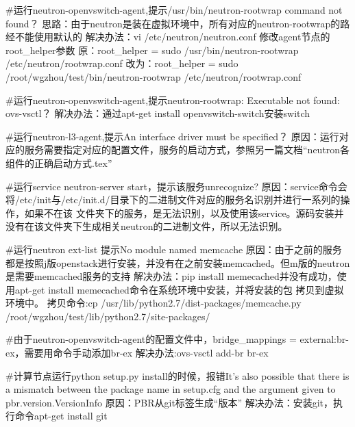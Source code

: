 \documentclass[a4paper,left=1.5cm,right=1.5cm,11pt]{article}
\begin{document}
\begin{itemize}
			#运行neutron-openvswitch-agent,提示/usr/bin/neutron-rootwrap command not found？
			思路：由于neutron是装在虚拟环境中，所有对应的neutron-rootwrap的路经不能使用默认的
			解决办法：vi /etc/neutron/neutron.conf 修改agent节点的root_helper参数
			原：root_helper = sudo /usr/bin/neutron-rootwrap /etc/neutron/rootwrap.conf
			改为：root_helper = sudo /root/wgzhou/test/bin/neutron-rootwrap /etc/neutron/rootwrap.conf

			#运行neutron-openvswitch-agent,提示neutron-rootwrap: Executable not found: ovs-vsctl？
			解决办法：通过apt-get install openvswitch-switch安装switch

			#运行neutron-l3-agent,提示An interface driver must be specified？
			原因：运行对应的服务需要指定对应的配置文件，服务的启动方式，参照另一篇文档“neutron各组件的正确启动方式.tex”

			#运行service neutron-server start，提示该服务unrecognize?
			原因：service命令会将/etc/init与/etc/init.d/目录下的二进制文件对应的服务名识别并进行一系列的操作，如果不在该
			文件夹下的服务，是无法识别，以及使用该service。源码安装并没有在该文件夹下生成相关neutron的二进制文件，所以无法识别。

			#运行neutron ext-list 提示No module named memcache
			原因：由于之前的服务都是按照j版openstack进行安装，并没有在之前安装memcached。但m版的neutron是需要memcached服务的支持
			解决办法：pip install memecached并没有成功，使用apt-get install memecached命令在系统环境中安装，并将安装的包
			拷贝到虚拟环境中。
			拷贝命令:cp /usr/lib/python2.7/dist-packages/memcache.py /root/wgzhou/test/lib/python2.7/site-packages/

			#由于neutron-openvswitch-agent的配置文件中，bridge_mappings = external:br-ex，需要用命令手动添加br-ex
			解决办法:ovs-vsctl add-br br-ex

			#计算节点运行python setup.py install的时候，报错It's also possible that there is a mismatch between the package name in setup.cfg and the argument given to pbr.version.VersionInfo
		    原因：PBR从git标签生成“版本”
			解决办法：安装git，执行命令apt-get install git 
		
    \end{itemize}
\end{document}
